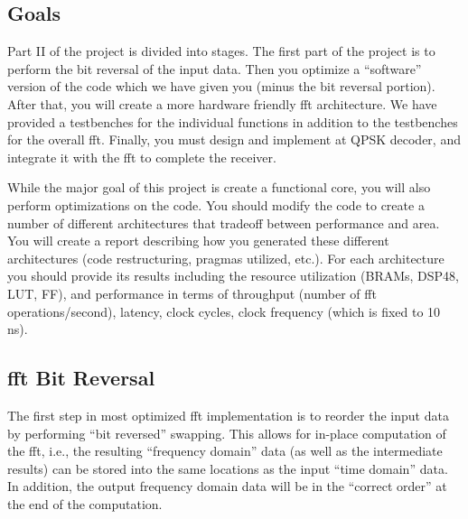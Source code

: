\subsection{Goals}
Part II of the project is divided into stages. The first part of the project is to perform the bit reversal of the input data. Then you optimize a ``software'' version of the code which we have given you (minus the bit reversal portion). After that, you will create a more hardware friendly \gls{fft} architecture. We have provided a testbenches for the individual functions in addition to the testbenches for the overall \gls{fft}. Finally, you must design and implement at QPSK decoder, and integrate it with the \gls{fft} to complete the receiver.

While the major goal of this project is create a functional core, you will also perform optimizations on the code. You should modify the code to create a number of different architectures that tradeoff between performance and area. You will create a report describing how you generated these different architectures (code restructuring, pragmas utilized, etc.). For each architecture you should provide its results including the resource utilization (BRAMs, DSP48, LUT, FF), and performance in terms of throughput (number of \gls{fft} operations/second), latency, clock cycles, clock frequency (which is fixed to 10 ns).

\subsection{\gls{fft} Bit Reversal}
The first step in most optimized \gls{fft} implementation is to reorder the input data by performing ``bit reversed'' swapping. This allows for in-place computation of the \gls{fft}, i.e., the resulting ``frequency domain'' data (as well as the intermediate results) can be stored into the same locations as the input ``time domain'' data. In addition, the output frequency domain data will be in the ``correct order'' at the end of the computation.

